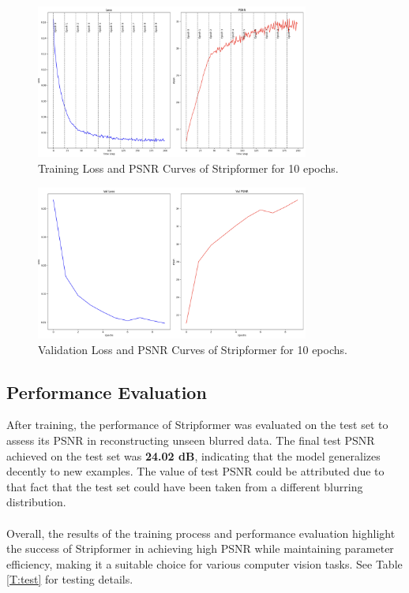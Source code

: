 \documentclass[12pt, a4paper, twoside]{article}
\begin{document}
			\begin{figure}[hbt!]
				\centering
				\includegraphics[width=0.8\textwidth]{train.png}
				\caption{Training Loss and PSNR Curves of Stripformer for 10 epochs.}
				\label{F:train}
			\end{figure}
			
			\begin{figure}[hbt!]
				\centering
				\includegraphics[width=0.8\textwidth]{val.png}
				\caption{Validation Loss and PSNR Curves of Stripformer for 10 epochs.}
				\label{F:val}
			\end{figure}
		
		\subsection{Performance Evaluation}
			After training, the performance of Stripformer was evaluated on the test set to assess its PSNR in reconstructing unseen blurred data. The final test PSNR achieved on the test set was \textbf{24.02 dB}, indicating that the model generalizes decently to new examples. The value of test PSNR could be attributed due to that fact that the test set could have been taken from a different blurring distribution.
			\\
			\\	
			Overall, the results of the training process and performance evaluation highlight the success of Stripformer in achieving high PSNR while maintaining parameter efficiency, making it a suitable choice for various computer vision tasks. See Table \ref{T:test} for testing details.
			
\end{document}
